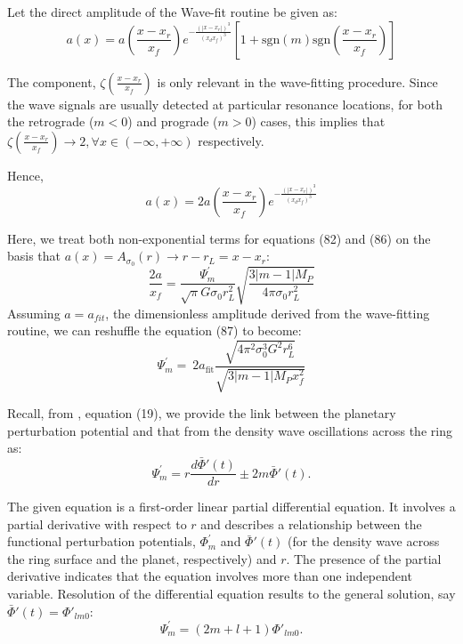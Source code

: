 \documentclass{article}
\begin{document}
\vspace{5}

Let the direct amplitude of the Wave-fit routine be given as:
\begin{equation}
    a(x) = a(\frac{x-x_{r}}{x_{f}})e^{-\frac{(|x-x_{r}|)^{3}}{(x_{d}x_{f})^{3}}}[1 + \mathrm{sgn}(m) \mathrm{sgn}(\frac{x-x_{r}}{x_{f}})]
\end{equation}

The component, $\zeta(\frac{x-x_{r}}{x_{f}})$ is only relevant in the wave-fitting procedure. Since the wave signals are usually detected at particular resonance locations, for both the retrograde ($m<0$) and prograde ($m>0$) cases, this implies that $\zeta(\frac{x-x_{r}}{x_{f}}) \rightarrow 2, \forall  x \in (-\infty,+\infty)$ respectively.

Hence,
\begin{equation}
    a(x) = 2a(\frac{x-x_{r}}{x_{f}})e^{-\frac{(|x-x_{r}|)^{3}}{(x_{d}x_{f})^{3}}}
\end{equation}

Here, we treat both non-exponential terms for equations (82) and (86) on the basis that $a(x) = A_{\sigma_{0}}(r) \rightarrow r-r_{L} = x-x_{r}$:
\begin{equation}
    \frac{2a}{x_{f}} = \frac{\Psi^{'}_{m}}{\sqrt{\pi} G\sigma_{0}r_{L}^{2}}\sqrt{\frac{3|m-1|M_{P}}{4\pi\sigma_{0}r_{L}^{2}}}
\end{equation}
Assuming $a = a_{fit}$, the dimensionless amplitude derived from the wave-fitting routine, we can reshuffle the equation (87) to become:
\begin{equation}
   \Psi^{'}_{m} = \ 2a_{\text{fit}} \frac{\sqrt{4\pi^{2}\sigma_{0}^{3}G^{2}r_{L}^{6}}}{\sqrt{3|m-1|M_{P} x_{f}^{2}}}
\end{equation}

Recall, from \cite{Hedman_2022}\cite{Marley1993PlanetaryAM}, equation (19), we provide the link between the planetary perturbation potential and that from the density wave oscillations across the ring as:
\begin{equation}
    \Psi^{'}_{m} = r \frac{d \bar{\Phi}{'}(t)}{dr} \pm 2m\bar{\Phi}{'}(t).
\end{equation}

The given equation is a first-order linear partial differential equation. It involves a partial derivative with respect to $r$ and describes a relationship between the functional perturbation potentials, $\Phi^{'}_{m}$ and $\bar{\Phi}{'}(t)$ (for the density wave across the ring surface and the planet, respectively) and $r$. The presence of the partial derivative indicates that the equation involves more than one independent variable. Resolution of the differential equation results to the general solution, say $\bar{\Phi}{'}(t) = \Phi{'}_{lm0}$:
\begin{equation}
   \Psi^{'}_{m} = (2m +l+1)\Phi{'}_{lm0}.
\end{equation}
\end{document}
